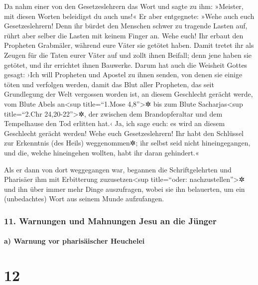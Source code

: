  Da nahm einer von den Gesetzeslehrern das Wort und sagte
zu ihm: »Meister, mit diesen Worten beleidigst du auch uns!«
 Er aber entgegnete: »Wehe auch euch Gesetzeslehrern!
Denn ihr bürdet den Menschen schwer zu tragende Lasten auf, rührt aber
selber die Lasten mit keinem Finger an.  Wehe euch! Ihr
erbaut den Propheten Grabmäler, während eure Väter sie getötet haben.
 Damit tretet ihr als Zeugen für die Taten eurer Väter
auf und zollt ihnen Beifall; denn jene haben sie getötet, und ihr
errichtet ihnen Bauwerke.  Darum hat auch die Weisheit
Gottes gesagt: ›Ich will Propheten und Apostel zu ihnen senden, von
denen sie einige töten und verfolgen werden,  damit das
Blut aller Propheten, das seit Grundlegung der Welt vergossen worden
ist, an diesem Geschlecht gerächt werde,  vom Blute Abels
an\textless sup title=``1.Mose 4,8''\textgreater✲ bis zum Blute
Sacharjas\textless sup title=``2.Chr 24,20-22''\textgreater✲, der
zwischen dem Brandopferaltar und dem Tempelhause den Tod erlitten hat.‹
Ja, ich sage euch: es wird an diesem Geschlecht gerächt werden!
 Wehe euch Gesetzeslehrern! Ihr habt den Schlüssel zur
Erkenntnis (des Heils) weggenommen✲; ihr selbst seid nicht
hineingegangen, und die, welche hineingehen wollten, habt ihr daran
gehindert.«

 Als er dann von dort weggegangen war, begannen die
Schriftgelehrten und Pharisäer ihm mit Erbitterung
zuzusetzen\textless sup title=``oder: nachzustellen''\textgreater✲ und
ihn über immer mehr Dinge auszufragen,  wobei sie ihn
belauerten, um ein (unbedachtes) Wort aus seinem Munde aufzufangen.

\hypertarget{warnungen-und-mahnungen-jesu-an-die-juxfcnger}{%
\subsubsection{11. Warnungen und Mahnungen Jesu an die
Jünger}\label{warnungen-und-mahnungen-jesu-an-die-juxfcnger}}

\hypertarget{a-warnung-vor-pharisuxe4ischer-heuchelei}{%
\paragraph{a) Warnung vor pharisäischer
Heuchelei}\label{a-warnung-vor-pharisuxe4ischer-heuchelei}}

\hypertarget{section-11}{%
\section{12}\label{section-11}}

